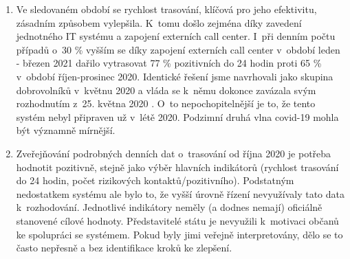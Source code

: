 \begin{enumerate}
\item Ve sledovaném období se rychlost trasování, klíčová pro jeho efektivitu, zá\-sad\-ním způsobem vylepšila. K~tomu došlo zejména díky zavedení jednotného IT sys\-té\-mu a zapojení externích call center. I~při denním počtu případů o~30 \% vyšším se díky zapojení externích call center v~období leden - březen 2021 dařilo vytrasovat 77 \% pozitivních do 24 hodin proti 65 \% v~období říjen-prosinec 2020. Identické řešení jsme navrhovali jako skupina dobrovolníků v~květnu 2020 \cite{tr_hlidac02} a vláda se k~němu dokonce zavázala svým rozhodnutím z~25. května 2020 \cite{tr_vlada01}. O~to nepochopitelnější je to, že tento systém nebyl připraven už v~létě 2020. Podzimní druhá vlna covid-19 mohla být významně mírnější.
\item Zveřejňování podrobných denních dat o~trasování od října 2020 je potřeba hodnotit pozitivně, stejně jako výběr hlavních indikátorů (rychlost trasování do 24 hodin, počet rizikových kontaktů/pozitivního). Podstatným nedostatkem systému ale bylo to, že vyšší úrovně řízení nevyužívaly tato data k~rozhodování. Jednotlivé indikátory neměly (a dodnes nemají) oficiálně stanovené cílové hodnoty. Představitelé státu je nevyužili k~motivaci občanů ke spolupráci se systémem. Pokud byly jimi veřejně interpretovány, dělo se to často nepřesně a bez identifikace kroků ke zlepšení.


\end{enumerate}
